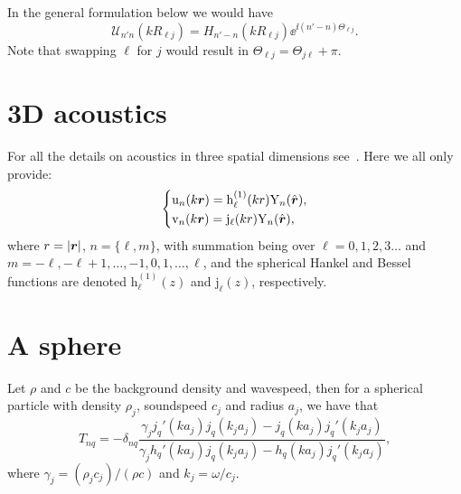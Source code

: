 \documentclass[ 12pt, a4paper]{article}
\begin{document}
In the general formulation below we would have
\[
\mathcal U_{n'n}(k R_{\ell j}) = H_{n'-n}(k R_{\ell j})\ee^{\ii(n'-n)\Theta_{\ell j}}.
\]
Note that swapping $\ell$ for $j$ would result in $\Theta_{\ell j} = \Theta_{j \ell } + \pi$.

\section{3D acoustics}

For all the details on acoustics in three spatial dimensions see~\cite{gower2020effective}. Here we all only provide:
\begin{equation}
\left\{\begin{aligned}
    & \mathrm u_{n}(k\boldsymbol{r}) = {\mathrm{h}}_\ell^{(1)}(kr)\mathrm{Y}_{n}(\hat{\boldsymbol{r}}),
    \label{eqn:outgoing_waves_and_regular_waves}
    \\
    & \mathrm v_{n}(k\boldsymbol{r}) = \mathrm{j}_\ell(kr)\mathrm{Y}_{n}(\hat{\boldsymbol{r}}),
 \end{aligned}\right.
\end{equation}
where $r=|\boldsymbol{r}|$, $n=\{\ell,m\}$, with summation being over $\ell=0,1,2,3\ldots$ and $m=-\ell,-\ell+1,\ldots,-1,0,1,\ldots,\ell$, and the spherical Hankel and Bessel functions are denoted ${\mathrm{h}}_\ell^{(1)}(z)$ and $\mathrm{j}_\ell(z)$, respectively.

\section{A sphere}
Let $\rho$ and $c$ be the background density and wavespeed, then for a spherical particle with density $\rho_j$, soundspeed $c_j$ and radius $a_j$, we have that
\begin{equation}
  T_{nq} = - \delta_{nq} \frac{\gamma_j j_q' (k a_j) j_q (k_j a_j) - j_q (k a_j) j_q' (k_j a_j) }{\gamma_j h_q '(k a_j) j_q(k_j a_j) - h_q(k a_j) j_q'(k_j a_j)},
  \label{eqn:circular_t-matrix}
\end{equation}
where $\gamma_j = (\rho_j c_j)/(\rho c)$ and $k_j = \omega/c_j$.

\printbibliography
\end{document}
